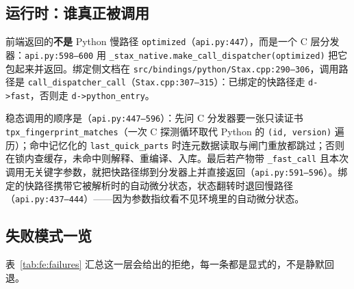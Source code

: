 \subsection{运行时：谁真正被调用}

前端返回的\textbf{不是} Python 慢路径 \texttt{optimized}（\texttt{api.py:447}），而是一个 C 层分发器：\texttt{api.py:598--600} 用 \texttt{\_stax\_native.make\_call\_dispatcher(optimized)} 把它包起来并返回。绑定侧文档在 \texttt{src/bindings/python/Stax.cpp:290--306}，调用路径是 \texttt{call\_dispatcher\_call}（\texttt{Stax.cpp:307--315}）：已绑定的快路径走 \texttt{d->fast}，否则走 \texttt{d->python\_entry}。

稳态调用的顺序是（\texttt{api.py:447--596}）：先问 C 分发器要一张只读证书 \texttt{tpx\_fingerprint\_matches}（一次 C 探测循环取代 Python 的 \texttt{(id, version)} 遍历）；命中记忆化的 \texttt{last\_quick\_parts} 时连元数据读取与闸门重放都跳过；否则在锁内查缓存，未命中则解释、重编译、入库。最后若产物带 \texttt{\_fast\_call} 且本次调用无关键字参数，就把快路径绑到分发器上并直接返回（\texttt{api.py:591--596}）。绑定的快路径携带它被解析时的自动微分状态，状态翻转时退回慢路径（\texttt{api.py:437--444}）——因为参数指纹看不见环境里的自动微分状态。

\subsection{失败模式一览}

表~\ref{tab:fe:failures} 汇总这一层会给出的拒绝，每一条都是显式的，不是静默回退。

